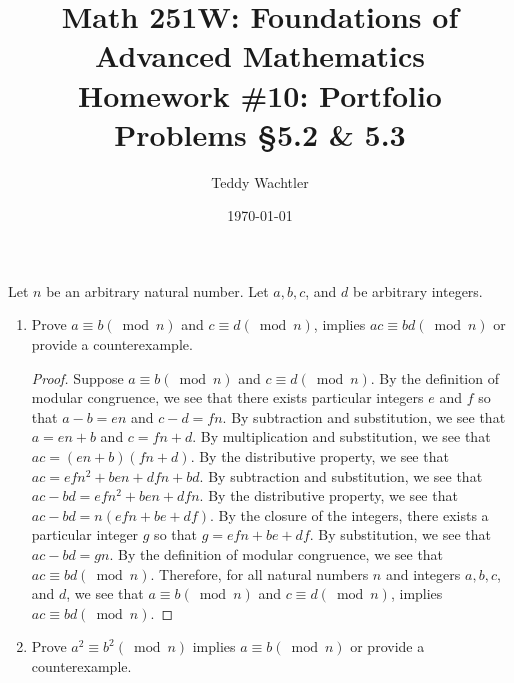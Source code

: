 \documentclass{amsart}
\numberwithin{equation}{section}
\begin{document}
	\title[Math 251W: Homework \#10]{
		Math 251W: Foundations of Advanced Mathematics \\
		\textmd{Homework \#10: Portfolio Problems \S 5.2 \& 5.3}}
	\author{Teddy Wachtler}
	\date{\today}

	\maketitle

	\begin{problem}[manual-num=54]
		Let $n$ be an arbitrary natural number.
		Let $a, b, c$, and $d$ be arbitrary integers.

		\begin{enumerate}
			\item[(3)]
			Prove $a \equiv b (\bmod n)$ and $c \equiv d (\bmod n)$, implies $ac \equiv bd (\bmod n)$ or provide a counterexample.

			\begin{proof}
				Suppose $a \equiv b (\bmod n)$ and $c \equiv d (\bmod n)$.
				By the definition of modular congruence, we see that there exists particular integers $e$ and $f$ so that $a - b = en$ and $c - d = fn$.
				By subtraction and substitution, we see that $a = en + b$ and $c = fn + d$.
				By multiplication and substitution, we see that $ac = (en + b)(fn + d)$.
				By the distributive property, we see that $ac = efn^2 + ben + dfn + bd$.
				By subtraction and substitution, we see that $ac - bd = efn^2 + ben + dfn$.
				By the distributive property, we see that $ac - bd = n(efn + be + df)$.
				By the closure of the integers, there exists a particular integer $g$ so that $g = efn + be + df$.
				By substitution, we see that $ac - bd = gn$.
				By the definition of modular congruence, we see that $ac \equiv bd (\bmod n)$.
				Therefore, for all natural numbers $n$ and integers $a, b, c$, and $d$, we see that $a \equiv b (\bmod n)$ and $c \equiv d (\bmod n)$, implies $ac \equiv bd (\bmod n)$.
			\end{proof}

			\item[(6)]
			Prove $a^2 \equiv b^2 (\bmod n)$ implies $a \equiv b (\bmod n)$ or provide a counterexample.


\end{enumerate}
\end{problem}
\end{document}
